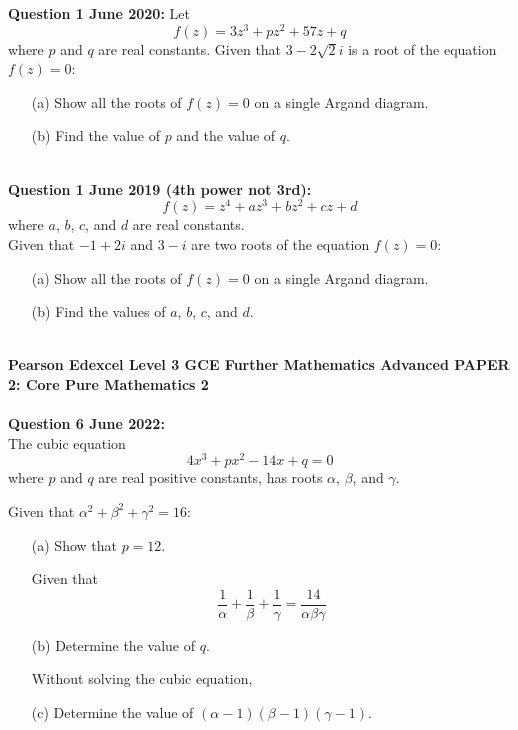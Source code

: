 \documentclass[12pt]{article}
\begin{document}
\textbf{Question 1 June 2020:}
Let 
\[f(z) = 3z^3 + pz^2 + 57z + q\]
where \( p \) and \( q \) are real constants. Given that \( 3 - 2\sqrt{2}i \) is a root of the equation \( f(z) = 0 \):
\begin{enumerate}
    \item[(a)] Show all the roots of \( f(z) = 0 \) on a single Argand diagram.    
    \item[(b)] Find the value of \( p \) and the value of \( q \).\\\\
\end{enumerate}

\textbf{Question 1 June 2019 (4th power not 3rd):}
\[f(z) = z^4 + az^3 + bz^2 + cz + d\] where \( a \), \( b \), \( c \), and \( d \) are real constants.\\
Given that \( -1 + 2i \) and \( 3 - i \) are two roots of the equation \( f(z) = 0 \):

\begin{enumerate}
    \item[(a)] Show all the roots of \( f(z) = 0 \) on a single Argand diagram.
    \item[(b)] Find the values of \( a \), \( b \), \( c \), and \( d \).\\\\
\end{enumerate}

\textbf{Pearson Edexcel Level 3 GCE Further Mathematics
Advanced PAPER 2: Core Pure Mathematics 2}\\\\

\textbf{Question 6 June 2022:}\\
The cubic equation
\[4x^3 + px^2 - 14x + q = 0\]
where \( p \) and \( q \) are real positive constants, has roots \( \alpha \), \( \beta \), and \( \gamma \).

Given that \( \alpha^2 + \beta^2 + \gamma^2 = 16 \):

\begin{enumerate}
    \item[(a)] Show that \( p = 12 \).
    
    Given that 
    \[\frac{1}{\alpha} + \frac{1}{\beta} + \frac{1}{\gamma} = \frac{14}{\alpha \beta \gamma}\]
    \item[(b)] Determine the value of \( q \).
    
    Without solving the cubic equation,
    \item[(c)] Determine the value of \( (\alpha - 1)(\beta - 1)(\gamma - 1) \).
\end{enumerate}
\end{document}
